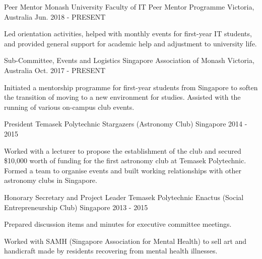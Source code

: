\begin{cventries}
  \cventry
    {Peer Mentor}
    {Monash University Faculty of IT Peer Mentor Programme}
    {Victoria, Australia}
    {Jun. 2018 - PRESENT}
    {
      \begin{cvitems}
        \item {Led orientation activities, helped with monthly events for first-year IT students, and provided general support for academic help and adjustment to university life.}
      \end{cvitems}
    }
    \cventry
    {Sub-Committee, Events and Logistics}
    {Singapore Association of Monash}
    {Victoria, Australia}
    {Oct. 2017 - PRESENT}
    {
      \begin{cvitems}
        \item {Initiated a mentorship programme for first-year students from Singapore to soften the transition of moving to a new environment for studies. Assisted with the running of various on-campus club events.}
      \end{cvitems}
    }
   \cventry
    {President}
    {Temasek Polytechnic Stargazers (Astronomy Club)}
    {Singapore}
    {2014 - 2015}
    {
      \begin{cvitems}
        \item {Worked with a lecturer to propose the establishment of the club and secured \$10,000 worth of funding for the first astronomy club at Temasek Polytechnic. Formed a team to organise events and built working relationships with other astronomy clubs in Singapore.}
      \end{cvitems}
    }
    \cventry
    {Honorary Secretary and Project Leader}
    {Temasek Polytechnic Enactus (Social Entrepreneurship Club)}
    {Singapore}
    {2013 - 2015}
    {
      \begin{cvitems}
        \item {Prepared discussion items and minutes for executive committee meetings.}
        \item {Worked with SAMH (Singapore Association for Mental Health) to sell art and handicraft made by residents recovering from mental health illnesses.}
      \end{cvitems}
    }
\end{cventries}
